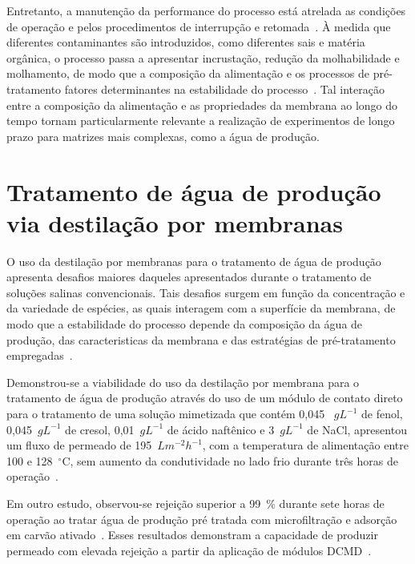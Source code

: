 Entretanto, a manutenção da performance do processo está atrelada as condições de operação e pelos procedimentos de interrupção e retomada~\cite{RuizAguirre2019PermeateQuality}. À medida que diferentes contaminantes são introduzidos, como diferentes sais e matéria orgânica, o processo passa a apresentar incrustação, redução da molhabilidade e molhamento, de modo que a composição da alimentação e os processos de pré-tratamento fatores determinantes na estabilidade do processo~\cite{Abdelrazeq2022DCMD,Adham2023,Gueccia2021HClRecovery}. Tal interação entre a composição da alimentação e as propriedades da membrana ao longo do tempo tornam particularmente relevante a realização de experimentos de longo prazo para matrizes mais complexas, como a água de produção.


\section{Tratamento de água de produção via destilação por membranas}


O uso da destilação por membranas para o tratamento de água de produção apresenta desafios maiores daqueles apresentados durante o tratamento de soluções salinas convencionais. Tais desafios surgem em função da concentração e da variedade de espécies, as quais interagem com a superfície da membrana, de modo que a estabilidade do processo depende da composição da água de produção, das caracteristicas da membrana e das estratégias de pré-tratamento empregadas~\cite{Singh2011DCMD, Macedonio2014_MD_ProducedWater, Thakur2020SGMD, Hsieh2021Pretreatments, Nawaz2021FO_MD, Pawar2022AGMD}.

Demonstrou-se a viabilidade do uso da destilação por membrana para o tratamento de água de produção através do uso de um módulo de contato direto para o tratamento de uma solução mimetizada que contém 0,045 ~$gL^{-1}$ de fenol, 0,045~$gL^{-1}$ de cresol, 0,01~$gL^{-1}$ de ácido naftênico e 3~$gL^{-1}$ de NaCl, apresentou um fluxo de permeado de 195~$Lm^{-2}h^{-1}$, com a temperatura de alimentação entre 100 e 128~$^\circ$C, sem aumento da condutividade no lado frio durante três horas de operação~\cite{Singh2011DCMD}.

Em outro estudo, observou-se rejeição superior a 99~\% durante sete horas de operação ao tratar água de produção pré tratada com microfiltração e adsorção em carvão ativado~\cite{Macedonio2014_MD_ProducedWater}. Esses resultados demonstram a capacidade de produzir permeado com elevada rejeição a partir da aplicação de módulos DCMD~\cite{Singh2011DCMD, Macedonio2014_MD_ProducedWater}.

